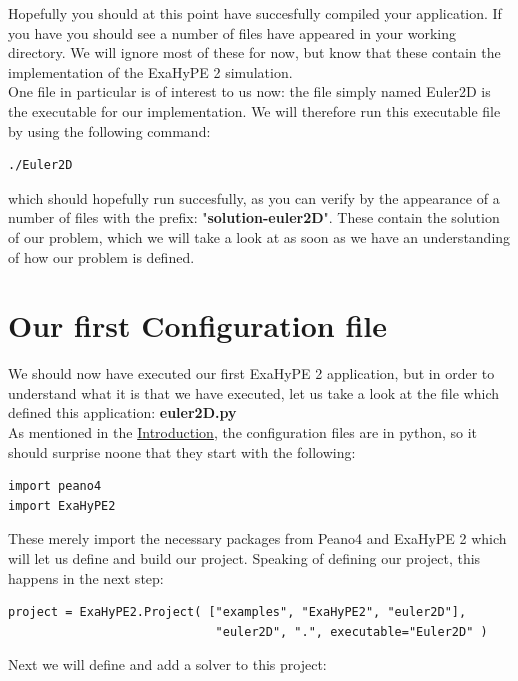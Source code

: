 \documentclass[12pt,letterpaper]{article}
\begin{document}
Hopefully you should at this point have succesfully compiled your application. If you have you should see a number of files have appeared in your working directory. We will ignore most of these for now, but know that these contain the implementation of the ExaHyPE 2 simulation.\\
One file in particular is of interest to us now: the file simply named Euler2D is the executable for our implementation. We will therefore run this executable file by using the following command:

\begin{lstlisting}[style = Bash]
./Euler2D
\end{lstlisting}

which should hopefully run succesfully, as you can verify by the appearance of a number of files with the prefix: "\textbf{solution-euler2D}". These contain the solution of our problem, which we will take a look at as soon as we have an understanding of how our problem is defined.\newpage

\section{Our first Configuration file}
\label{section_3}


We should now have executed our first ExaHyPE 2 application, but in order to understand what it is that we have executed, let us take a look at the file which defined this application: \textbf{euler2D.py}\\
As mentioned in the \hyperref[sec:Introduction]{Introduction}, the configuration files are in python, so it should surprise noone that they start with the following:

\begin{lstlisting}[style = Python]
import peano4
import ExaHyPE2
\end{lstlisting}

These merely import the necessary packages from Peano4 and ExaHyPE 2 which will let us define and build our project. Speaking of defining our project, this happens in the next step:\\

\begin{lstlisting}[style = Python]
project = ExaHyPE2.Project( ["examples", "ExaHyPE2", "euler2D"],
                             "euler2D", ".", executable="Euler2D" )
\end{lstlisting}

Next we will define and add a solver to this project:\\
\end{document}
